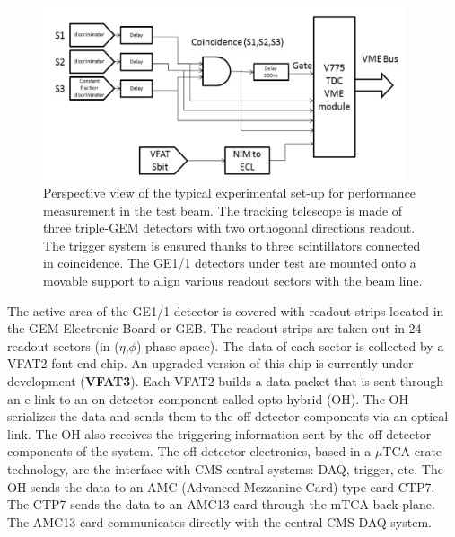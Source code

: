 \begin{figure}[!htbp]
\centering
\includegraphics[width=0.95\textwidth]{figures/GEM/daq.png}
\caption{Perspective view of the typical experimental set-up for performance measurement in the test beam. The tracking telescope is made of three triple-GEM detectors with two orthogonal directions readout. The trigger system is ensured thanks to three scintillators connected in coincidence. The GE1/1 detectors under test are mounted onto a movable support to align various readout sectors with the beam line.}\label{fig:tbs}
\end{figure}
The active area of the GE1/1 detector is covered with readout strips located in the GEM Electronic Board or GEB. 
The readout strips are taken out in 24 readout sectors (in ($\eta$,$\phi$) phase space).
The data of each sector is collected by a VFAT2 font-end chip. 
An upgraded version of this chip is currently under development (\textbf{VFAT3}). 
Each VFAT2 builds a data packet that is sent through an e-link to an on-detector component called opto-hybrid (OH). 
The OH serializes the data and sends them to the off detector components via an optical link. 
The OH also receives the triggering information sent by the off-detector components of the system. 
The off-detector electronics, based in a $\mu$TCA crate technology, are the interface with CMS central systems: DAQ, trigger, etc. 
The OH sends the data to an AMC (Advanced Mezzanine Card) type card CTP7. The CTP7 sends the data to an AMC13 card through the mTCA back-plane. 
The AMC13 card communicates directly with the central CMS DAQ system.

